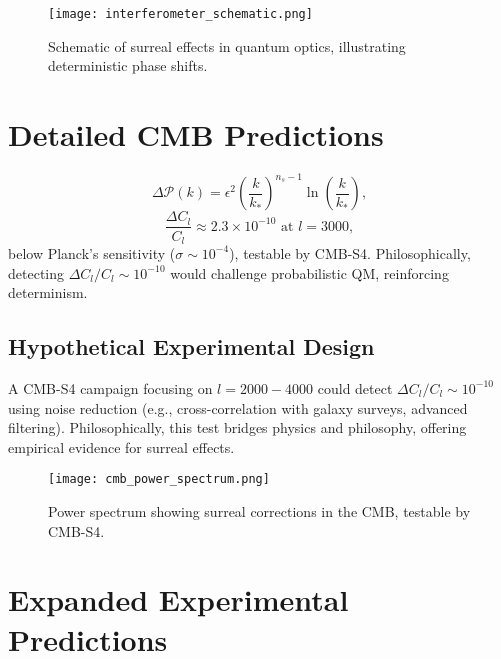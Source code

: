 \documentclass{article}
\begin{document}
\begin{figure}[h]
    \centering
    \texttt{[image: interferometer\_schematic.png]}
    \caption{Schematic of surreal effects in quantum optics, illustrating deterministic phase shifts.}
    \label{fig:interferometer}
\end{figure}

\section{Detailed CMB Predictions}
\begin{equation}
\Delta \mathcal{P}(k) = \epsilon^2 \left( \frac{k}{k_*} \right)^{n_s-1} \ln \left( \frac{k}{k_*} \right),
\end{equation}
\begin{equation}
\frac{\Delta C_l}{C_l} \approx 2.3 \times 10^{-10} \text{ at } l = 3000,
\end{equation}
below Planck's sensitivity (\(\sigma \sim 10^{-4}\)), testable by CMB-S4. Philosophically, detecting \(\Delta C_l / C_l \sim 10^{-10}\) would challenge probabilistic QM, reinforcing determinism.

\subsection{Hypothetical Experimental Design}
A CMB-S4 campaign focusing on \(l = 2000-4000\) could detect \(\Delta C_l / C_l \sim 10^{-10}\) using noise reduction (e.g., cross-correlation with galaxy surveys, advanced filtering). Philosophically, this test bridges physics and philosophy, offering empirical evidence for surreal effects.

\begin{figure}[h]
    \centering
    \texttt{[image: cmb\_power\_spectrum.png]}
    \caption{Power spectrum showing surreal corrections in the CMB, testable by CMB-S4.}
    \label{fig:cmb_spectrum}
\end{figure}

\section{Expanded Experimental Predictions}
\end{document}
